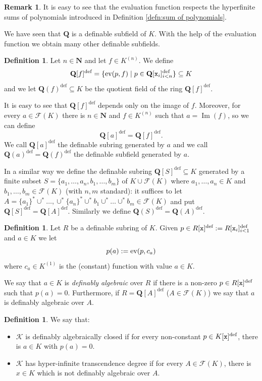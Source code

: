\documentclass{amsart}
\newcommand{\ca}{\mathcal}
\newcommand{\img}{\operatorname{Im}}
\theoremstyle{plain}
\theoremstyle{definition}
\newtheorem{rem}[thm]{Remark}
\newtheorem{defn}[thm]{Definition}
\newcommand{\ev}{\textnormal{ev}}
\newcommand{\F}{\mathcal{F}}
\newcommand{\hn}{\mathbf N}
\newcommand{\hQ}{\mathbf Q}
\newcommand{\polyn}[2]{{#1}[{\tt x}_i]_{i<#2}^\text{def}}
\begin{document}
\begin{rem}It is easy to see that the evaluation function respects the hyperfinite sums of polynomials introduced in Definition \ref{defn:sum of polynomials}. 
\end{rem}

We have seen that $\hQ$ is a definable subfield of $K$. With the help of the evaluation function we obtain many other definable subfields. 


\begin{defn}\label{defn:generated-field}
Let $n\in \hn$ and let $f\in K^{(n)}$. We define 
$$\hQ[f]^{\text{def}} = \{\ev(p, f) \mid p\in \polyn {\hQ} n\} \subseteq K$$ 
and we let $\hQ(f)^{\text{def}} \subseteq K$ be the quotient field of the ring $\hQ[f]^{\text{def}}$. 

It is easy to see that $\hQ[f]^{\text{def}}$ depends only on the image of $f$. Moreover, for every $a\in \F(K)$ there is $n\in \hn$ and $f\in K^{(n)}$ such that $a = \img(f)$, so we can define 
$$\hQ[a]^{\text{def}} = \hQ[f]^{\text{def}}.$$ We call $\hQ[a]^{\text{def}}$ the definable subring generated by $a$ and we call $\hQ(a)^{\text{def}} = \hQ(f)^{\text{def}}$ the definable subfield generated by $a$. 

In a similar way we define the definable subring $\hQ[S]^{\text{def}} \subseteq K$ generated by a finite subset $S = \{a_1, \ldots, a_n, b_1, \ldots, b_m\}$ of $K\cup \F(K)$ where $a_1, \ldots, a_n\in K$ and $b_1, \ldots, b_m\in \F(K)$ (with $n,m$ standard): it suffices to let $A = \{a_1\}^* \cup^* \ldots, \cup^* \{a_n\}^* \cup^* b_1 \cup^* \ldots \cup^* b_m \in \F(K)$
and put $\hQ[S]^{\text{def}} = \hQ[A]^{\text{def}}$. Similarly we define $\hQ(S)^{\text{def}} = \hQ(A)^{\text{def}}$. 
\end{defn}

\begin{defn} \label{defn:algebraic} Let $R$ be a definable subring of $K$. Given $p \in R[{\tt x}]^{\text{def}}:= \polyn R 1$ and $a \in K$ we let 
%
$$p(a):=\ev(p, c_a)$$
%
 where $c_a \in K^{(1)}$ is the (constant) function with value $a\in K$.

 We say that $a\in K$ is \emph{definably algebraic} over $R$  if there is a non-zero $p \in R[{\tt x}]^{\text{def}}$ such that $p(a) = 0$.  Furthermore, if $R = \hQ[A]^{\text{def}}$ ($A\in \F(K)$) we say that $a$ is definably algebraic over $A$. 
\end{defn}


\begin{defn} \label{defn:alg closed} We say that:
\begin{itemize}
\item $\ca K$ is definably algebraically closed if for every non-constant $p\in K[{\tt x}]^{\text{def}}$, there is $a\in K$ with $p(a) = 0$. 
\item $\ca K$ has hyper-infinite transcendence degree if for every $A\in \F(K)$, there is $x\in K$ which is not definably algebraic over $A$. 
\end{itemize}
\end{defn}
\end{document}
